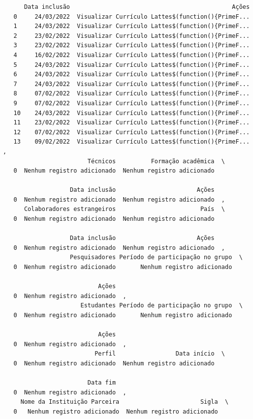 \documentclass[
  brazilian,
  letterpaper,
  DIV=11,
  numbers=noendperiod]{scrartcl}
\begin{document}
\begin{verbatim}
      Data inclusão                                              Ações  
   0     24/03/2022  Visualizar Currículo Lattes$(function(){PrimeF...  
   1     24/03/2022  Visualizar Currículo Lattes$(function(){PrimeF...  
   2     23/02/2022  Visualizar Currículo Lattes$(function(){PrimeF...  
   3     23/02/2022  Visualizar Currículo Lattes$(function(){PrimeF...  
   4     16/02/2022  Visualizar Currículo Lattes$(function(){PrimeF...  
   5     24/03/2022  Visualizar Currículo Lattes$(function(){PrimeF...  
   6     24/03/2022  Visualizar Currículo Lattes$(function(){PrimeF...  
   7     24/03/2022  Visualizar Currículo Lattes$(function(){PrimeF...  
   8     07/02/2022  Visualizar Currículo Lattes$(function(){PrimeF...  
   9     07/02/2022  Visualizar Currículo Lattes$(function(){PrimeF...  
   10    24/03/2022  Visualizar Currículo Lattes$(function(){PrimeF...  
   11    23/02/2022  Visualizar Currículo Lattes$(function(){PrimeF...  
   12    07/02/2022  Visualizar Currículo Lattes$(function(){PrimeF...  
   13    09/02/2022  Visualizar Currículo Lattes$(function(){PrimeF...  ,
                        Técnicos          Formação acadêmica  \
   0  Nenhum registro adicionado  Nenhum registro adicionado   
   
                   Data inclusão                       Ações  
   0  Nenhum registro adicionado  Nenhum registro adicionado  ,
      Colaboradores estrangeiros                        País  \
   0  Nenhum registro adicionado  Nenhum registro adicionado   
   
                   Data inclusão                       Ações  
   0  Nenhum registro adicionado  Nenhum registro adicionado  ,
                   Pesquisadores Período de participação no grupo  \
   0  Nenhum registro adicionado       Nenhum registro adicionado   
   
                           Ações  
   0  Nenhum registro adicionado  ,
                      Estudantes Período de participação no grupo  \
   0  Nenhum registro adicionado       Nenhum registro adicionado   
   
                           Ações  
   0  Nenhum registro adicionado  ,
                          Perfil                 Data início  \
   0  Nenhum registro adicionado  Nenhum registro adicionado   
   
                        Data fim  
   0  Nenhum registro adicionado  ,
     Nome da Instituição Parceira                       Sigla  \
   0   Nenhum registro adicionado  Nenhum registro adicionado   
   

\end{verbatim}
\end{document}
